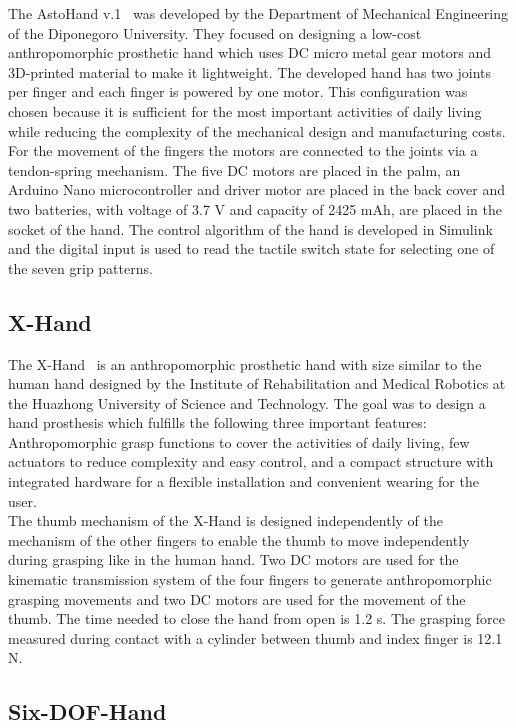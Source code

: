 \documentclass[a4paper, 10pt, conference]{ieeeconf}      %
\begin{document}
The AstoHand v.1~\cite{astohand} was developed by the Department of Mechanical Engineering of the Diponegoro University. They focused on designing a low-cost anthropomorphic prosthetic hand which uses DC micro metal gear motors and 3D-printed material to make it lightweight. The developed hand has two joints per finger and each finger is powered by one motor. This configuration was chosen because it is sufficient for the most important activities of daily living while reducing the complexity of the mechanical design and manufacturing costs. For the movement of the fingers the motors are connected to the joints via a tendon-spring mechanism. The five DC motors are placed in the palm, an Arduino Nano microcontroller and driver motor are placed in the back cover and two batteries, with voltage of 3.7 V and capacity of 2425 mAh, are placed in the socket of the hand. The control algorithm of the hand is developed in Simulink and the digital input is used to read the tactile switch state for selecting one of the seven grip patterns.

\subsection{X-Hand}

The X-Hand~\cite{xhand} is an anthropomorphic prosthetic hand with size similar to the human hand designed by the Institute of Rehabilitation and Medical Robotics at the Huazhong University of Science and Technology. The goal was to design a hand prosthesis which fulfills the following three important features: Anthropomorphic grasp functions to cover the activities of daily living, few actuators to reduce complexity and easy control, and a compact structure with integrated hardware for a flexible installation and convenient wearing for the user.\\
The thumb mechanism of the X-Hand is designed independently of the mechanism of the other fingers to enable the thumb to move independently during grasping like in the human hand. Two DC motors are used for the kinematic transmission system of the four fingers to generate anthropomorphic grasping movements and two DC motors are used for the movement of the thumb. The time needed to close the hand from open is 1.2 s. The grasping force measured during contact with a cylinder between thumb and index finger is 12.1 N.

\subsection{Six-DOF-Hand}
\end{document}
